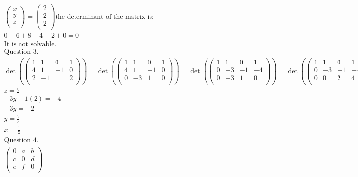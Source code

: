 \documentclass{article}
\begin{document}
\begin{align*}
    \begin{pmatrix}
        x \\
        y \\
        z \\
    \end{pmatrix}
    =
    \begin{pmatrix}
        2 \\
        2 \\
        2 \\
    \end{pmatrix}
    \textrm{the determinant of the matrix is:} \\
    0 - 6 + 8 - 4 + 2 + 0 = 0                  \\
    \textrm{It is not solvable.}               \\
    \textrm{Question 3.}                       \\
    \det(
    \begin{pmatrix}
            1 & 1  & 0  & 1 \\
            4 & 1  & -1 & 0 \\
            2 & -1 & 1  & 2 \\
        \end{pmatrix})
    =
    \det(
    \begin{pmatrix}
            1 & 1  & 0  & 1 \\
            4 & 1  & -1 & 0 \\
            0 & -3 & 1  & 0 \\
        \end{pmatrix})
    =
    \det(
    \begin{pmatrix}
            1 & 1  & 0  & 1  \\
            0 & -3 & -1 & -4 \\
            0 & -3 & 1  & 0  \\
        \end{pmatrix}
    )
    =
    \det(
    \begin{pmatrix}
            1 & 1  & 0  & 1  \\
            0 & -3 & -1 & -4 \\
            0 & 0  & 2  & 4  \\
        \end{pmatrix}
    )                                          \\
    z = 2                                      \\
    -3y -1(2) = -4                             \\
    -3y = -2                                   \\
    y = \frac{2}{3}                            \\
    x = \frac{1}{3}                            \\
    \textrm{Question 4.}                       \\
    \begin{pmatrix}
        0 & a & b \\
        c & 0 & d \\
        e & f & 0 \\
    \end{pmatrix}
\end{align*}
\end{document}
